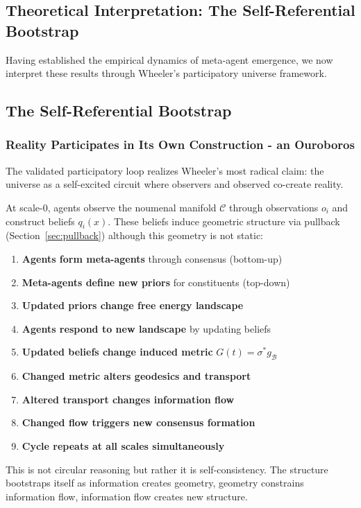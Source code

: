 \documentclass[11pt]{article}
\begin{document}
\subsection{Theoretical Interpretation: The Self-Referential Bootstrap}

Having established the empirical dynamics of meta-agent emergence, we now interpret these results through Wheeler's participatory universe framework.

\subsection{The Self-Referential Bootstrap}

\subsubsection{Reality Participates in Its Own Construction - an Ouroboros}

The validated participatory loop realizes Wheeler's most radical claim: the universe as a self-excited circuit where observers and observed co-create reality.

At scale-0, agents observe the noumenal manifold $\mathcal{C}$ through observations $o_i$ and construct beliefs $q_i(x)$. These beliefs induce geometric structure via pullback (Section~\ref{sec:pullback}) although this geometry is not static:

\begin{enumerate}
\item \textbf{Agents form meta-agents} through consensus (bottom-up)
\item \textbf{Meta-agents define new priors} for constituents (top-down)
\item \textbf{Updated priors change free energy landscape}
\item \textbf{Agents respond to new landscape} by updating beliefs
\item \textbf{Updated beliefs change induced metric} $G(t) = \sigma^*g_{\mathcal{B}}$
\item \textbf{Changed metric alters geodesics and transport}
\item \textbf{Altered transport changes information flow}
\item \textbf{Changed flow triggers new consensus formation}
\item \textbf{Cycle repeats at all scales simultaneously}
\end{enumerate}

This is not circular reasoning but rather it is self-consistency. The structure bootstraps itself as information creates geometry, geometry constrains information flow, information flow creates new structure.
\end{document}
